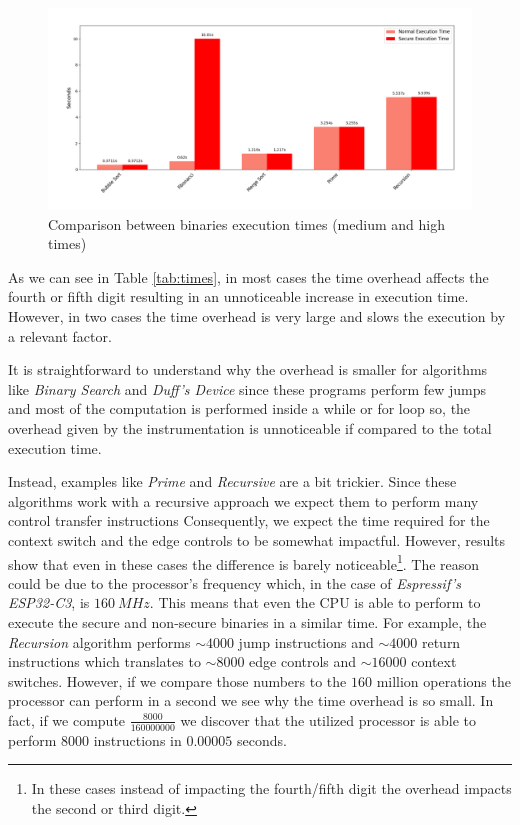 \begin{figure}[htbp]
  \centering
  \includegraphics[width=.9\linewidth]{images/high_execution.png}
  \caption{Comparison between binaries execution times (medium and high times)}
  \label{fig:hightime}
\end{figure}

As we can see in Table \ref{tab:times}, in most cases the time overhead affects
the fourth or fifth digit resulting in an unnoticeable increase in execution
time. However, in two cases the time overhead is very large and slows the
execution by a relevant factor.

It is straightforward to understand why the overhead is smaller for algorithms
like \textit{Binary Search} and \textit{Duff's Device} since these programs
perform few jumps and most of the computation is performed inside a while or for
loop so, the overhead given by the instrumentation is unnoticeable if compared to
the total execution time.

Instead, examples like \textit{Prime} and \textit{Recursive} are a bit trickier.
Since these algorithms work with a recursive approach we expect them to perform many
control transfer instructions Consequently, we expect the time required for the
context switch and the edge controls to be somewhat impactful. However, results
show that even in these cases the difference is barely noticeable\footnote{In
these cases instead of impacting the fourth/fifth digit the overhead impacts the
second or third digit.}. The reason could be due to the processor's frequency
which, in the case of \textit{Espressif's ESP32-C3}, is $160 \ MHz$. This means
that even the CPU is able to perform to execute the secure and non-secure
binaries in a similar time. For example, the \textit{Recursion} algorithm performs
$\sim 4000$ jump instructions and $\sim 4000$ return instructions which translates
to $\sim 8000$ edge controls and $\sim 16000$ context switches. However, if we compare
those numbers to the $160$ million operations the processor can perform in a second
we see why the time overhead is so small. In fact, if we compute $\frac{8000}{160000000}$
we discover that the utilized processor is able to perform $8000$ instructions in
$0.00005$ seconds.

